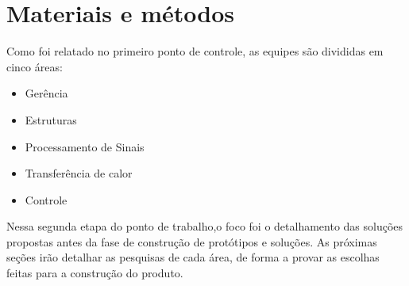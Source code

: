\chapter{Materiais e métodos}

Como foi relatado no primeiro ponto de controle, as equipes são divididas em cinco áreas:
\begin{itemize}
\item Gerência
\item Estruturas
\item Processamento de Sinais
\item Transferência de calor
\item Controle
\end{itemize}

Nessa segunda etapa do ponto de trabalho,o foco foi o detalhamento das soluções propostas antes da fase de construção de protótipos e soluções. As próximas seções irão detalhar as pesquisas de cada área, de forma a provar as escolhas feitas para a construção do produto.
